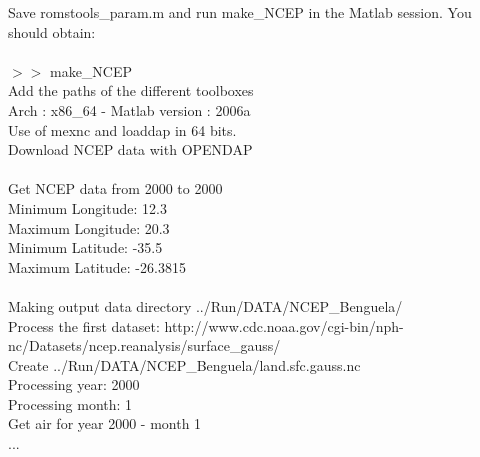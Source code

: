Save romstools\_param.m and run make\_NCEP in the Matlab session.
You should obtain:
\\\\
$>>$ make\_NCEP\\
Add the paths of the different toolboxes\\
Arch : x86\_64 - Matlab version : 2006a\\
Use of mexnc and loaddap in 64 bits.\\
Download NCEP data with OPENDAP\\
\\
Get NCEP data from 2000 to 2000\\
Minimum Longitude: 12.3\\
Maximum Longitude: 20.3\\
Minimum Latitude: -35.5\\
Maximum Latitude: -26.3815\\
\\
Making output data directory ../Run/DATA/NCEP\_Benguela/\\
Process the first dataset: http://www.cdc.noaa.gov/cgi-bin/nph-nc/Datasets/ncep.reanalysis/surface\_gauss/\\
    Create ../Run/DATA/NCEP\_Benguela/land.sfc.gauss.nc\\
Processing year: 2000\\
  Processing month: 1\\
    Get air for year 2000 - month 1\\
...


